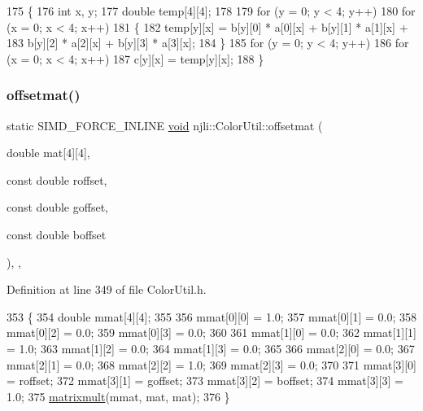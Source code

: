 \begin{DoxyCode}
175     \{
176       \textcolor{keywordtype}{int} x, y;
177       \textcolor{keywordtype}{double} temp[4][4];
178 
179       \textcolor{keywordflow}{for} (y = 0; y < 4; y++)
180         \textcolor{keywordflow}{for} (x = 0; x < 4; x++)
181           \{
182             temp[y][x] = b[y][0] * a[0][x] + b[y][1] * a[1][x] +
183                          b[y][2] * a[2][x] + b[y][3] * a[3][x];
184           \}
185       \textcolor{keywordflow}{for} (y = 0; y < 4; y++)
186         \textcolor{keywordflow}{for} (x = 0; x < 4; x++)
187           c[y][x] = temp[y][x];
188     \}
\end{DoxyCode}
\mbox{\label{classnjli_1_1_color_util_a41a9d5c0daa4ab6c0bf04aa9c66ea6d2}} 
\subsubsection{\texorpdfstring{offsetmat()}{offsetmat()}}
{\footnotesize\ttfamily static S\+I\+M\+D\+\_\+\+F\+O\+R\+C\+E\+\_\+\+I\+N\+L\+I\+NE \mbox{\hyperlink{_thread_8h_af1e856da2e658414cb2456cb6f7ebc66}{void}} njli\+::\+Color\+Util\+::offsetmat (\begin{DoxyParamCaption}\item[{double}]{mat\mbox{[}4\mbox{]}\mbox{[}4\mbox{]},  }\item[{const double}]{roffset,  }\item[{const double}]{goffset,  }\item[{const double}]{boffset }\end{DoxyParamCaption})\hspace{0.3cm}{\ttfamily [inline]}, {\ttfamily [static]}, {\ttfamily [protected]}}



Definition at line 349 of file Color\+Util.\+h.


\begin{DoxyCode}
353     \{
354       \textcolor{keywordtype}{double} mmat[4][4];
355 
356       mmat[0][0] = 1.0;
357       mmat[0][1] = 0.0;
358       mmat[0][2] = 0.0;
359       mmat[0][3] = 0.0;
360 
361       mmat[1][0] = 0.0;
362       mmat[1][1] = 1.0;
363       mmat[1][2] = 0.0;
364       mmat[1][3] = 0.0;
365 
366       mmat[2][0] = 0.0;
367       mmat[2][1] = 0.0;
368       mmat[2][2] = 1.0;
369       mmat[2][3] = 0.0;
370 
371       mmat[3][0] = roffset;
372       mmat[3][1] = goffset;
373       mmat[3][2] = boffset;
374       mmat[3][3] = 1.0;
375       \mbox{\hyperlink{classnjli_1_1_color_util_a5cb3576c8177f303c88dc4e7283367c7}{matrixmult}}(mmat, mat, mat);
376     \}
\end{DoxyCode}
\mbox{\label{classnjli_1_1_color_util_a2e1a337beed33d364c29a4f2140ba215}} 
